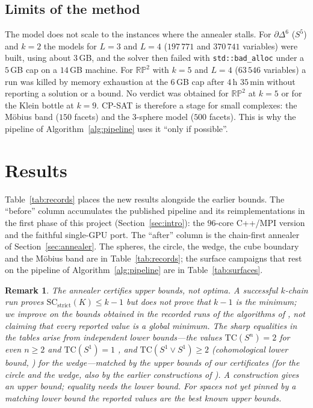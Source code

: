 \documentclass[12pt]{article}
\newcommand{\TC}{\mathrm{TC}}
\newcommand{\SC}{\mathrm{SC}}
\newcommand{\SCst}{\SC_{\mathrm{strict}}}
\newtheorem{remark}[theo]{Remark}
\begin{document}
\subsection{Limits of the method}

The model does not scale to the instances where the annealer stalls.
For $\partial\Delta^6$ ($S^5$) and $k=2$ the models for $L=3$ and $L=4$
($197\,771$ and $370\,741$ variables) were built, using about $3$\,GB,
and the solver then failed with \texttt{std::bad\_alloc} under a $5$\,GB
cap on a $14$\,GB machine.  For $\mathbb{RP}^2$ with $k=5$ and $L=4$
($63\,546$ variables) a run was killed by memory exhaustion at the $6$\,GB
cap after $4$\,h $35$\,min without reporting a solution or a bound.  No
verdict was obtained for $\mathbb{RP}^2$ at $k=5$ or for the Klein bottle at
$k=9$.  CP-SAT is therefore a stage for small complexes: the M\"obius
band ($150$ facets) and the $3$-sphere model ($500$ facets).  This is
why the pipeline of Algorithm~\ref{alg:pipeline} uses it ``only if
possible''.

\section{Results}\label{sec:results}

Table~\ref{tab:records} places the new results alongside the earlier
bounds.  The ``before'' column accumulates the
published pipeline \cite{OLGB21} and its reimplementations in the first
phase of this project (Section~\ref{sec:intro}): the $96$-core C++/MPI
version and the faithful single-GPU port.  The ``after'' column is
the chain-first annealer of Section~\ref{sec:annealer}.  The spheres,
the circle, the wedge, the cube boundary and the M\"obius band are in
Table~\ref{tab:records}; the surface campaigns that rest on the pipeline
of Algorithm~\ref{alg:pipeline} are in Table~\ref{tab:surfaces}.

\begin{remark}
The annealer certifies upper bounds, not optima.  A successful $k$-chain
run proves $\SCst(K)\le k-1$ but does not prove that $k-1$ is the
minimum; we improve on the bounds obtained in the recorded runs of the
algorithms of \cite{OLGB21}, not claiming that every reported value is a global
minimum.  The sharp equalities in the tables arise from independent
lower bounds---the values $\TC(S^n)=2$ for even $n\ge2$ and
$\TC(S^1)=1$ \cite{F03}, and $\TC(S^1\vee S^1)\ge2$ (cohomological lower bound,
\cite{F03}) for the wedge---matched by the upper bounds of our certificates (for the
circle and the wedge, also by the earlier constructions of
\cite{OLGB21}).  A construction gives an upper bound; equality needs
the lower bound.  For spaces not yet
pinned by a matching lower bound the reported values are the best known
upper bounds.
\end{remark}
\end{document}
